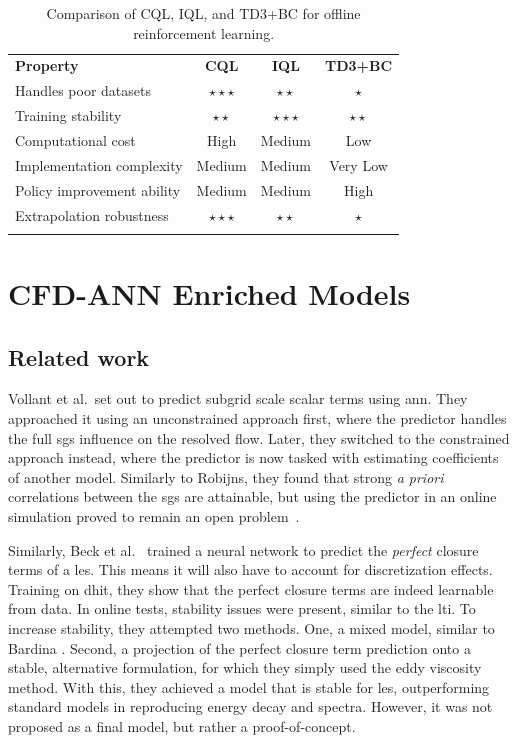 \begin{table}[h]
    \centering
    \caption{Comparison of CQL, IQL, and TD3+BC for offline reinforcement learning.}
    \label{tab:offline_rl_comparison}
    \begin{tabular}{l c c c}
        \bluetoprule
        \textbf{Property} & \textbf{CQL} & \textbf{IQL} & \textbf{TD3+BC} \\
        \blueheadrule
        Handles poor datasets & $\star\star\star$ & $\star\star$ & $\star$ \\
        Training stability & $\star\star$ & $\star\star\star$ & $\star\star$ \\
        Computational cost & High & Medium & Low \\
        Implementation complexity & Medium & Medium & Very Low \\
        Policy improvement ability & Medium & Medium & High \\
        Extrapolation robustness & $\star\star\star$ & $\star\star$ & $\star$ \\
        \bluebottomrule
    \end{tabular}
\end{table}

\section{CFD-ANN Enriched Models} \label{sec:cfd_nn}

\subsection{Related work} \label{subsec:other_work}

Vollant et al.\ set out to predict subgrid scale scalar terms using \gls{ann}.
They approached it using an unconstrained approach first, where the predictor handles the full \gls{sgs} influence on the resolved flow.
Later, they switched to the constrained approach instead, where the predictor is now tasked with estimating coefficients of another model.
Similarly to Robijns, they found that strong \emph{a priori} correlations between the \gls{sgs} are attainable, but using the predictor in an online simulation proved to remain an open problem~\cite{Vollant2017}.

Similarly, Beck et al.~\cite{Beck2019} trained a neural network to predict the \emph{perfect} closure terms of a \gls{les}.
This means it will also have to account for discretization effects.
Training on \gls{dhit}, they show that the perfect closure terms are indeed learnable from data.
In online tests, stability issues were present, similar to the \gls{lti}.
To increase stability, they attempted two methods.
One, a mixed model, similar to Bardina .
Second, a projection of the perfect closure term prediction onto a stable, alternative formulation, for which they simply used the eddy viscosity method.
With this, they achieved a model that is stable for \gls{les}, outperforming standard models in reproducing energy decay and spectra.
However, it was not proposed as a final model, but rather a proof-of-concept.

